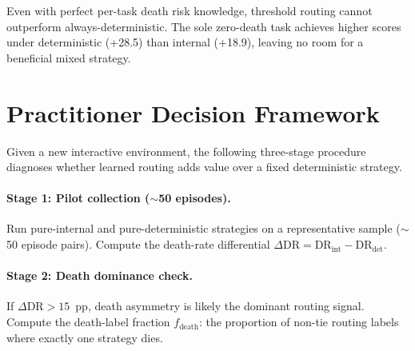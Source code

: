 \documentclass[11pt]{article}
\begin{document}
\begin{table}[h]
\centering
\small
{}
\caption{Death-risk threshold routing analysis on 245 episodes. The optimal threshold routes only \texttt{find-non-living-thing} (the sole zero-death task) to internal, with all other tasks routed to deterministic. Bootstrap 95\% CI for the difference: $[-8.87, +5.92]$.}
\label{tab:threshold-routing}
\end{table}

Even with perfect per-task death risk knowledge, threshold routing cannot outperform always-deterministic. The sole zero-death task achieves higher scores under deterministic (+28.5) than internal (+18.9), leaving no room for a beneficial mixed strategy.

\section{Practitioner Decision Framework}
\label{app:decision-framework}

Given a new interactive environment, the following three-stage procedure diagnoses whether learned routing adds value over a fixed deterministic strategy.

\paragraph{Stage 1: Pilot collection (${\sim}$50 episodes).}
Run pure-internal and pure-deterministic strategies on a representative sample (${\sim}$50 episode pairs). Compute the death-rate differential $\Delta\text{DR} = \text{DR}_{\text{int}} - \text{DR}_{\text{det}}$.

\paragraph{Stage 2: Death dominance check.}
If $\Delta\text{DR} > 15$~pp, death asymmetry is likely the dominant routing signal. Compute the death-label fraction $f_{\text{death}}$: the proportion of non-tie routing labels where exactly one strategy dies.
\end{document}
